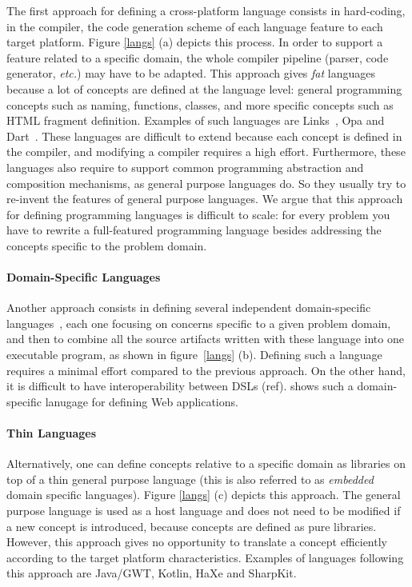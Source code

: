 \documentclass[preprint]{sigplanconf}
\newcommand{\etc}{\emph{etc.}}
\begin{document}
The first approach for defining a cross-platform language consists in hard-coding, in the compiler, the
code generation scheme of each language feature to each target platform. Figure \ref{langs} (a) depicts this
process. In order to support a feature related to a specific domain, the whole compiler pipeline (parser, code
generator, \etc) may have to be adapted. This approach gives \emph{fat} languages because a lot of concepts are
defined at the language level: general programming concepts such as naming, functions, classes, and more specific
concepts such as HTML fragment definition. Examples of such languages are Links~\cite{Cooper07_Links}, Opa and
Dart~\cite{Griffith11_Dart}. These languages are difficult to extend because each concept is defined in the compiler,
and modifying a compiler requires a high effort. Furthermore, these languages also require to support common
programming abstraction and composition mechanisms, as general purpose languages do. So they usually try to re-invent
the features of general purpose languages. We argue that this approach for defining programming languages is
difficult to scale: for every problem you have to rewrite a full-featured programming language besides addressing the
concepts specific to the problem domain.

\paragraph{Domain-Specific Languages}

Another approach consists in defining several independent domain-specific languages~\cite{Van00_DSL}, each one
focusing on concerns specific to a given problem domain, and then to combine all the source artifacts written with
these language into one executable program, as shown in figure~\ref{langs} (b). Defining such a language requires a
minimal effort compared to the previous approach. On the other hand, it is difficult to have interoperability between
DSLs (ref). \cite{Groenewegen08_WebDSL} shows such a domain-specific lanugage for defining Web applications.

\paragraph{Thin Languages}

Alternatively, one can define concepts relative to a specific domain as libraries on top of a thin general purpose
language (this is also referred to as \emph{embedded} domain specific languages). Figure \ref{langs} (c) depicts this
approach. The general purpose language is used as a host language and does not need to be modified if a new concept
is introduced, because concepts are defined as pure libraries. However, this approach gives no opportunity to
translate a concept efficiently according to the target platform characteristics. Examples of languages following
this approach are Java/GWT, Kotlin, HaXe and SharpKit.
\end{document}
